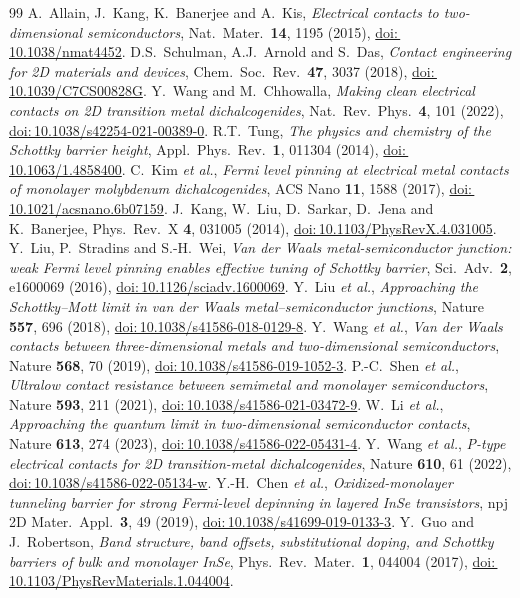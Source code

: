 \documentclass[11pt]{article}
\providecommand{\doi}[1]{\href{https://doi.org/#1}{doi:\,#1}}
\begin{document}
\begin{thebibliography}{99}
 A.~Allain, J.~Kang, K.~Banerjee and A.~Kis, \textit{Electrical contacts to two-dimensional semiconductors}, Nat.\ Mater.\ \textbf{14}, 1195 (2015), \doi{10.1038/nmat4452}.
 D.S.~Schulman, A.J.~Arnold and S.~Das, \textit{Contact engineering for 2D materials and devices}, Chem.\ Soc.\ Rev.\ \textbf{47}, 3037 (2018), \doi{10.1039/C7CS00828G}.
 Y.~Wang and M.~Chhowalla, \textit{Making clean electrical contacts on 2D transition metal dichalcogenides}, Nat.\ Rev.\ Phys.\ \textbf{4}, 101 (2022), \doi{10.1038/s42254-021-00389-0}.
 R.T.~Tung, \textit{The physics and chemistry of the Schottky barrier height}, Appl.\ Phys.\ Rev.\ \textbf{1}, 011304 (2014), \doi{10.1063/1.4858400}.
 C.~Kim \textit{et al.}, \textit{Fermi level pinning at electrical metal contacts of monolayer molybdenum dichalcogenides}, ACS Nano \textbf{11}, 1588 (2017), \doi{10.1021/acsnano.6b07159}.
 J.~Kang, W.~Liu, D.~Sarkar, D.~Jena and K.~Banerjee, Phys.\ Rev.\ X \textbf{4}, 031005 (2014), \doi{10.1103/PhysRevX.4.031005}.
 Y.~Liu, P.~Stradins and S.-H.~Wei, \textit{Van der Waals metal-semiconductor junction: weak Fermi level pinning enables effective tuning of Schottky barrier}, Sci.\ Adv.\ \textbf{2}, e1600069 (2016), \doi{10.1126/sciadv.1600069}.
 Y.~Liu \textit{et al.}, \textit{Approaching the Schottky--Mott limit in van der Waals metal--semiconductor junctions}, Nature \textbf{557}, 696 (2018), \doi{10.1038/s41586-018-0129-8}.
 Y.~Wang \textit{et al.}, \textit{Van der Waals contacts between three-dimensional metals and two-dimensional semiconductors}, Nature \textbf{568}, 70 (2019), \doi{10.1038/s41586-019-1052-3}.
 P.-C.~Shen \textit{et al.}, \textit{Ultralow contact resistance between semimetal and monolayer semiconductors}, Nature \textbf{593}, 211 (2021), \doi{10.1038/s41586-021-03472-9}.
 W.~Li \textit{et al.}, \textit{Approaching the quantum limit in two-dimensional semiconductor contacts}, Nature \textbf{613}, 274 (2023), \doi{10.1038/s41586-022-05431-4}.
 Y.~Wang \textit{et al.}, \textit{P-type electrical contacts for 2D transition-metal dichalcogenides}, Nature \textbf{610}, 61 (2022), \doi{10.1038/s41586-022-05134-w}.
 Y.-H.~Chen \textit{et al.}, \textit{Oxidized-monolayer tunneling barrier for strong Fermi-level depinning in layered InSe transistors}, npj 2D Mater.\ Appl.\ \textbf{3}, 49 (2019), \doi{10.1038/s41699-019-0133-3}.
 Y.~Guo and J.~Robertson, \textit{Band structure, band offsets, substitutional doping, and Schottky barriers of bulk and monolayer InSe}, Phys.\ Rev.\ Mater.\ \textbf{1}, 044004 (2017), \doi{10.1103/PhysRevMaterials.1.044004}.

\end{thebibliography}
\end{document}
